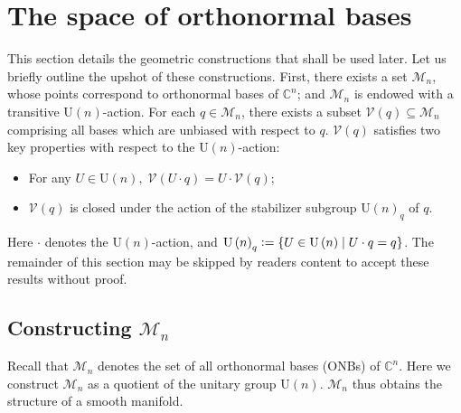\documentclass[referee,sn-mathphys-num]{sn-jnl}%
\theoremstyle{thmstyleone}%
\theoremstyle{thmstyletwo}%
\theoremstyle{remark}
\theoremstyle{thmstylethree}%
\newcommand{\defeq}{\vcentcolon=}
\begin{document}
\section{The space of orthonormal bases}\label{sec:geometry}
This section details the geometric constructions that shall be used later. Let us briefly outline the upshot of these constructions. First, there exists a set $ \mathcal{M}_n $, whose points correspond to orthonormal bases of $ \mathbb{C}^n $; and $ \mathcal{M}_n $ is endowed with a transitive $ \mathrm{U} \left( n \right) $-action. For each $ q \in \mathcal{M}_n $, there exists a subset $ \mathcal{V} \left( q \right) \subseteq \mathcal{M}_n $ comprising all bases which are unbiased with respect to $q$. $ \mathcal{V} \left( q \right) $ satisfies two key properties with respect to the $ \mathrm{U} \left( n \right) $-action:
\begin{itemize}
	\item For any $ U \in \mathrm{U} \left( n \right) , \; \mathcal{V} \left( U \cdot q \right) = U \cdot \mathcal{V} \left( q \right) $;
	\item $\mathcal{V} \left( q \right)$ is closed under the action of the stabilizer subgroup $ \mathrm{U} \left( n \right)_q $ of $q$.
\end{itemize}
Here $ \cdot $ denotes the $ \mathrm{U} \left( n \right) $-action, and $ \mathrm{U} \left( n \right)_q \defeq \left\{ U \in \mathrm{U} \left( n \right) \mid U \cdot q = q \right\} $. The remainder of this section may be skipped by readers content to accept these results without proof.

\subsection{Constructing $ \mathcal{M}_n $}\label{sec:M_n}
Recall that $\mathcal{M}_n$ denotes the set of all orthonormal bases (ONBs) of $ \mathbb{C}^n $. Here we construct $\mathcal{M}_n$ as a quotient of the unitary group $\mathrm{U}(n)$. $\mathcal{M}_n$ thus obtains the structure of a smooth manifold.
\end{document}
